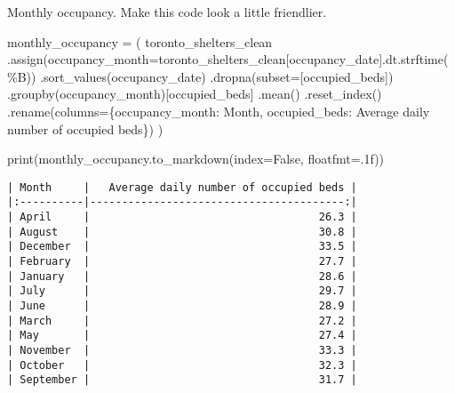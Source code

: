 \documentclass[
  letterpaper,
  DIV=11,
  numbers=noendperiod]{scrreprt}
\newenvironment{Shaded}{\begin{snugshade}}{\end{snugshade}}
\newcommand{\BuiltInTok}[1]{\textcolor[rgb]{0.00,0.23,0.31}{#1}}
\newcommand{\NormalTok}[1]{\textcolor[rgb]{0.00,0.23,0.31}{#1}}
\newcommand{\OperatorTok}[1]{\textcolor[rgb]{0.37,0.37,0.37}{#1}}
\newcommand{\StringTok}[1]{\textcolor[rgb]{0.13,0.47,0.30}{#1}}
\newcommand{\VariableTok}[1]{\textcolor[rgb]{0.07,0.07,0.07}{#1}}
\begin{document}
Monthly occupancy. Make this code look a little friendlier.

\begin{Shaded}
\begin{Highlighting}[]
\NormalTok{monthly\_occupancy }\OperatorTok{=}\NormalTok{ (}
\NormalTok{    toronto\_shelters\_clean}
\NormalTok{    .assign(occupancy\_month}\OperatorTok{=}\NormalTok{toronto\_shelters\_clean[}\StringTok{\textquotesingle{}occupancy\_date\textquotesingle{}}\NormalTok{].dt.strftime(}\StringTok{\textquotesingle{}\%B\textquotesingle{}}\NormalTok{))}
\NormalTok{    .sort\_values(}\StringTok{\textquotesingle{}occupancy\_date\textquotesingle{}}\NormalTok{)}
\NormalTok{    .dropna(subset}\OperatorTok{=}\NormalTok{[}\StringTok{\textquotesingle{}occupied\_beds\textquotesingle{}}\NormalTok{])}
\NormalTok{    .groupby(}\StringTok{\textquotesingle{}occupancy\_month\textquotesingle{}}\NormalTok{)[}\StringTok{\textquotesingle{}occupied\_beds\textquotesingle{}}\NormalTok{]}
\NormalTok{    .mean()}
\NormalTok{    .reset\_index()}
\NormalTok{    .rename(columns}\OperatorTok{=}\NormalTok{\{}\StringTok{\textquotesingle{}occupancy\_month\textquotesingle{}}\NormalTok{: }\StringTok{\textquotesingle{}Month\textquotesingle{}}\NormalTok{, }\StringTok{\textquotesingle{}occupied\_beds\textquotesingle{}}\NormalTok{: }\StringTok{\textquotesingle{}Average daily number of occupied beds\textquotesingle{}}\NormalTok{\})}
\NormalTok{)}

\BuiltInTok{print}\NormalTok{(monthly\_occupancy.to\_markdown(index}\OperatorTok{=}\VariableTok{False}\NormalTok{, floatfmt}\OperatorTok{=}\StringTok{\textquotesingle{}.1f\textquotesingle{}}\NormalTok{))}
\end{Highlighting}
\end{Shaded}

\begin{verbatim}
| Month     |   Average daily number of occupied beds |
|:----------|----------------------------------------:|
| April     |                                    26.3 |
| August    |                                    30.8 |
| December  |                                    33.5 |
| February  |                                    27.7 |
| January   |                                    28.6 |
| July      |                                    29.7 |
| June      |                                    28.9 |
| March     |                                    27.2 |
| May       |                                    27.4 |
| November  |                                    33.3 |
| October   |                                    32.3 |
| September |                                    31.7 |
\end{verbatim}
\end{document}
